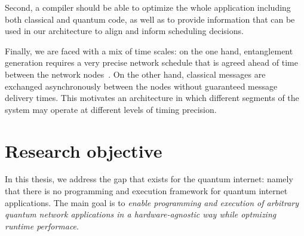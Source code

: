 Second, a compiler should be able to optimize the whole application including both classical and quantum code, as well as to provide information that can be used in our architecture to align and inform scheduling decisions. 

Finally, we are faced with a mix of time scales:
on the one hand, entanglement generation requires a very precise network schedule that is agreed ahead of time between the network nodes~\cite{dahlberg2019link}. On the other hand, classical messages are exchanged asynchronously between the nodes without guaranteed message delivery times. This motivates an architecture in which different segments of the system may operate at different levels of timing precision. 


\section{Research objective}
In this thesis, we address the gap that exists for the quantum internet: namely that there is no programming and execution framework for quantum internet applications.
The main goal is to \emph{enable programming and execution of arbitrary quantum network applications in a hardware-agnostic way while optmizing runtime performace}.


